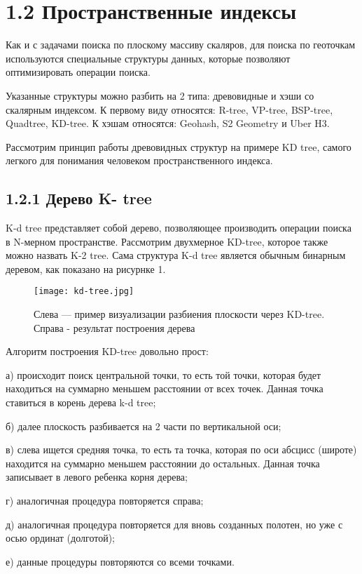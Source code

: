 \section{1.2 Пространственные индексы}
Как и с задачами поиска по плоскому массиву скаляров, для поиска по геоточкам используются специальные структуры данных, которые позволяют оптимизировать операции поиска. 

Указанные структуры можно разбить на 2 типа: древовидные и хэши со скалярным индексом. К первому виду относятся: R-tree, VP-tree, BSP-tree, Quadtree, KD-tree. К хэшам относятся: Geohash, S2 Geometry и Uber H3.

Рассмотрим принцип работы древовидных структур на примере KD tree, самого легкого для понимания человеком пространственного индекса.

\subsection{1.2.1 Дерево K- tree}
K-d tree представляет собой дерево, позволяющее производить операции поиска в N-мерном пространстве. Рассмотрим двухмерное KD-tree, которое также можно назвать K-2 tree.
Сама структура K-d tree является обычным бинарным деревом, как показано на рисурнке 1.
\par\vspace{1em}
\begin{figure}[H]
    \centering
    \texttt{[image: kd-tree.jpg]}
    \caption{Слева — пример визуализации разбиения плоскости через KD-tree. Справа - результат построения дерева}
\end{figure}

Алгоритм построения KD-tree довольно прост\cite{nnq}:
\par а) происходит поиск центральной точки, то есть той точки, которая будет находиться на суммарно меньшем расстоянии от всех точек. Данная точка ставиться в корень дерева k-d tree;
\par б) далее плоскость разбивается на 2 части по вертикальной оси;
\par в) слева ищется средняя точка, то есть та точка, которая по оси абсцисс (широте) находится на суммарно меньшем расстоянии до остальных. Данная точка записывает в левого ребенка корня дерева;
\par г) аналогичная процедура повторяется справа;
\par д) аналогичная процедура повторяется для вновь созданных полотен, но уже с осью ординат (долготой);
\par е) данные процедуры повторяются со всеми точками.


